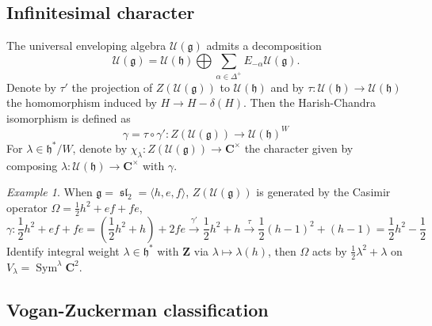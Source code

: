 \documentclass[leqno]{amsart}
\DeclareMathOperator{\sll}{\mathfrak{sl}}
\newcommand{\Z}{{\mathbf{Z}}}
\newcommand{\C}{\mathbf C}
\newcommand{\1}{\mathbf{1}}
\newcommand{\cfg}{\mathfrak{g}}
\newcommand{\cfh}{\mathfrak{h}}
\DeclareMathOperator{\Sym}{Sym}
\theoremstyle{definition}
\theoremstyle{remark}
\newtheorem{example}{Example}
\begin{document}
\subsection{Infinitesimal character}
The universal enveloping algebra
$\mathcal{U}(\cfg)$
admits a decomposition
\[
	\mathcal{U}(\cfg)=
	\mathcal{U}(\cfh)\bigoplus 
	\sum_{\alpha\in\Delta^+}E_{-\alpha}\mathcal{U}(\cfg).
\]
Denote by $\tau'$
the projection of $Z(\mathcal{U}(\cfg))$ to $\mathcal{U}(\cfh)$
and by $\tau\colon \mathcal{U}(\cfh)\to\mathcal{U}(\cfh)$ 
the homomorphism induced by $H\to H-\delta(H)$.
Then the Harish-Chandra isomorphism is defined as
\[
	\gamma=\tau\circ\gamma'\colon Z(\mathcal{U}(\cfg))\to
	\mathcal{U}(\cfh)^W
\]
For $\lambda\in\cfh^*/W$,
denote by $\chi_\lambda\colon Z(\mathcal{U}(\cfg))\to\C^\times$
the character given by composing 
$\lambda\colon \mathcal{U}(\cfh)\to \C^\times$
with $\gamma$.
\begin{example}
	When $\cfg=\sll_2=\langle h,e,f\rangle$,
	$Z(\mathcal{U}(\cfg))$
	is generated by the Casimir operator
	$\Omega=\frac{1}{2}h^2+ef+fe$,
	\[
		\gamma\colon 
		\frac{1}{2}h^2+ef+fe=(\frac{1}{2}h^2+h)+2fe
		\xrightarrow{\gamma'} \frac{1}{2}h^2+h
		\xrightarrow{\tau} \frac{1}{2}(h-1)^2+(h-1)
		=\frac{1}{2}h^2-\frac{1}{2}
	\]
	Identify integral weight $\lambda\in\cfh^*$
	with $\Z$ via  $\lambda\mapsto \lambda(h)$,
	then $\Omega$ acts by  $\frac{1}{2}\lambda^2+\lambda$
	on $V_\lambda=\Sym^\lambda\C^2$.
\end{example}

\subsection{Vogan-Zuckerman classification}
\end{document}
